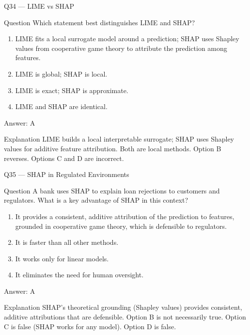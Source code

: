 \documentclass[aspectratio=169,8pt]{beamer}
\begin{document}
	\begin{frame}{Q34 --- LIME vs SHAP}
		\begin{block}{Question}
			Which statement best distinguishes LIME and SHAP?
			\begin{enumerate}
				\item LIME fits a local surrogate model around a prediction; SHAP uses Shapley values from cooperative game theory to attribute the prediction among features.
				\item LIME is global; SHAP is local.
				\item LIME is exact; SHAP is approximate.
				\item LIME and SHAP are identical.
			\end{enumerate}
		\end{block}
		\begin{exampleblock}{Answer: A}\end{exampleblock}
		\begin{block}{Explanation}
			LIME builds a local interpretable surrogate; SHAP uses Shapley values for additive feature attribution. Both are local methods. Option B reverses. Options C and D are incorrect.
		\end{block}
	\end{frame}
	
	\begin{frame}{Q35 --- SHAP in Regulated Environments}
		\begin{block}{Question}
			A bank uses SHAP to explain loan rejections to customers and regulators. What is a key advantage of SHAP in this context?
			\begin{enumerate}
				\item It provides a consistent, additive attribution of the prediction to features, grounded in cooperative game theory, which is defensible to regulators.
				\item It is faster than all other methods.
				\item It works only for linear models.
				\item It eliminates the need for human oversight.
			\end{enumerate}
		\end{block}
		\begin{exampleblock}{Answer: A}\end{exampleblock}
		\begin{block}{Explanation}
			SHAP's theoretical grounding (Shapley values) provides consistent, additive attributions that are defensible. Option B is not necessarily true. Option C is false (SHAP works for any model). Option D is false.
		\end{block}
	\end{frame}
	
\end{document}
